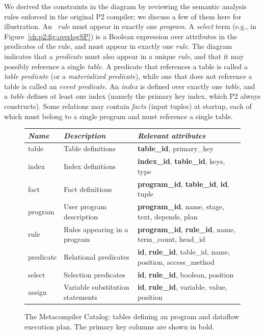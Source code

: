 We derived the constraints in the diagram by reviewing the semantic analysis
rules enforced in the original P2 compiler; we discuss a few of them here for
illustration.  An \OVERLOG~{\em rule} must appear in exactly one {\em program}.
A {\em select} term (e.g.,  in
Figure~\ref{ch:p2:fig:overlogSP}) is a Boolean expression over attributes in
the predicates of the rule, and must appear in exactly one {\em rule}.  The
diagram indicates that a {\em predicate} must also appear in a unique {\em
rule}, and that it may possibly reference a single {\em table}.  A predicate
that references a table is called a {\em table predicate} (or a
\emph{materialized predicate}), while one that does not reference a table is
called an {\em event predicate}.  An {\em index} is defined over exactly one
{\em table}, and a {\em table} defines at least one index (namely the primary
key index, which P2 always constructs).  Some relations may contain {\em facts}
(input tuples) at startup, each of which must belong to a single program and
must reference a single table.

\begin{figure}
\ssp
\begin{tabular}{|l|l|p{7cm}|} \hline
{\it Name}& {\it Description} & {\it Relevant attributes} \\ \hline\hline
table     & Table definitions & {\bf table\_id}, primary\_key\\ \hline
index     & Index definitions & {\bf index\_id}, {\bf table\_id}, keys, type \\ \hline
fact      & Fact definitions  & {\bf program\_id}, {\bf table\_id}, {\bf id}, tuple\\ \hline
program   & User program description     & {\bf program\_id}, name, stage, text, depends, plan \\ \hline
rule      & Rules appearing in a program   & {\bf program\_id}, {\bf rule\_id}, name,  term\_count, head\_id \\ \hline
predicate & Relational predicates  & {\bf id}, {\bf rule\_id}, table\_id, name, position, access\_method \\ \hline
select    & Selection predicates  & {\bf id}, {\bf rule\_id}, boolean, position \\  \hline
assign    & Variable substitution statements & {\bf id}, {\bf rule\_id}, variable, value, position \\ \hline 
\end{tabular}
\caption{The Metacompiler Catalog: tables defining an \OVERLOG program and dataflow execution plan.
         The primary key columns are shown in bold. }
\label{tbl:catalog}
\end{figure}

